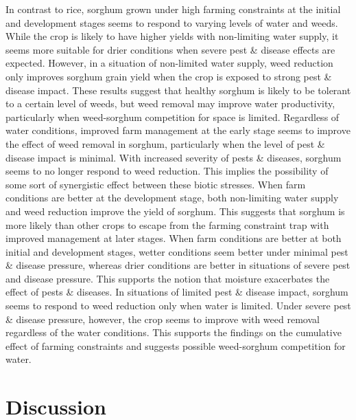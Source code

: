 \documentclass[]{elsarticle} %
\begin{document}
In contrast to rice, sorghum grown under high farming constraints at the initial and development stages seems to respond to varying levels of water and weeds. While the crop is likely to have higher yields with non-limiting water supply, it seems more suitable for drier conditions when severe pest \& disease effects are expected. However, in a situation of non-limited water supply, weed reduction only improves sorghum grain yield when the crop is exposed to strong pest \& disease impact. These results suggest that healthy sorghum is likely to be tolerant to a certain level of weeds, but weed removal may improve water productivity, particularly when weed-sorghum competition for space is limited. Regardless of water conditions, improved farm management at the early stage seems to improve the effect of weed removal in sorghum, particularly when the level of pest \& disease impact is minimal. With increased severity of pests \& diseases, sorghum seems to no longer respond to weed reduction. This implies the possibility of some sort of synergistic effect between these biotic stresses. When farm conditions are better at the development stage, both non-limiting water supply and weed reduction improve the yield of sorghum. This suggests that sorghum is more likely than other crops to escape from the farming constraint trap with improved management at later stages. When farm conditions are better at both initial and development stages, wetter conditions seem better under minimal pest \& disease pressure, whereas drier conditions are better in situations of severe pest and disease pressure. This supports the notion that moisture exacerbates the effect of pests \& diseases. In situations of limited pest \& disease impact, sorghum seems to respond to weed reduction only when water is limited. Under severe pest \& disease pressure, however, the crop seems to improve with weed removal regardless of the water conditions. This supports the findings on the cumulative effect of farming constraints and suggests possible weed-sorghum competition for water.

\hypertarget{ref5}{%
\section{Discussion}\label{ref5}}
\end{document}
